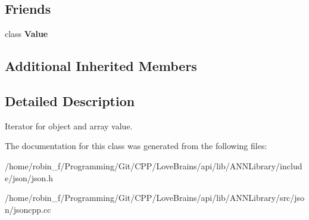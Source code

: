 \subsection*{Friends}
\begin{DoxyCompactItemize}
\item 
\hypertarget{class_json_1_1_value_iterator_aeceedf6e1a7d48a588516ce2b1983d6f}{}class {\bfseries Value}\label{class_json_1_1_value_iterator_aeceedf6e1a7d48a588516ce2b1983d6f}

\end{DoxyCompactItemize}
\subsection*{Additional Inherited Members}


\subsection{Detailed Description}
Iterator for object and array value. 

The documentation for this class was generated from the following files\+:\begin{DoxyCompactItemize}
\item 
/home/robin\+\_\+f/\+Programming/\+Git/\+C\+P\+P/\+Love\+Brains/api/lib/\+A\+N\+N\+Library/include/json/json.\+h\item 
/home/robin\+\_\+f/\+Programming/\+Git/\+C\+P\+P/\+Love\+Brains/api/lib/\+A\+N\+N\+Library/src/json/jsoncpp.\+cc\end{DoxyCompactItemize}
